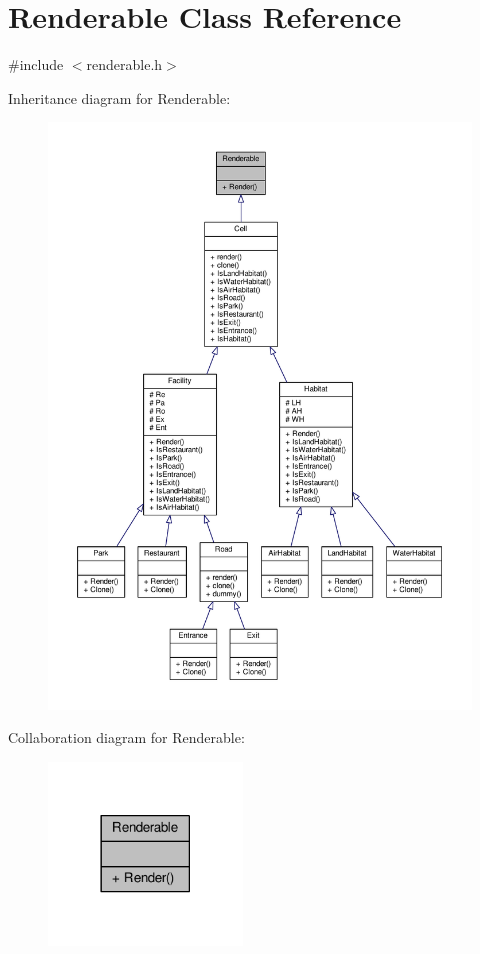 \hypertarget{classRenderable}{}\section{Renderable Class Reference}
\label{classRenderable}


{\ttfamily \#include $<$renderable.\+h$>$}



Inheritance diagram for Renderable\+:
\nopagebreak
\begin{figure}[H]
\begin{center}
\leavevmode
\includegraphics[width=350pt]{classRenderable__inherit__graph}
\end{center}
\end{figure}


Collaboration diagram for Renderable\+:
\nopagebreak
\begin{figure}[H]
\begin{center}
\leavevmode
\includegraphics[width=146pt]{classRenderable__coll__graph}
\end{center}
\end{figure}
